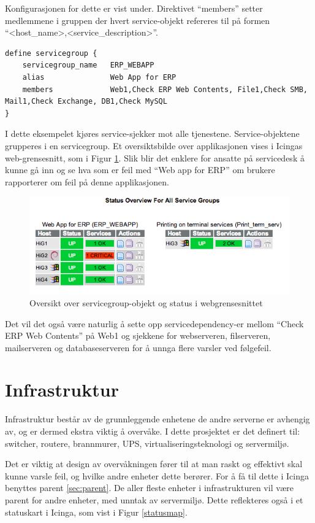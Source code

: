 Konfigurasjonen for dette er vist under. Direktivet ``members'' setter medlemmene i gruppen der hvert service-objekt refereres til på formen ``<host\_name>,<service\_description>''.

\begin{lstlisting}[style=example]
define servicegroup {
	servicegroup_name	ERP_WEBAPP
	alias 				Web App for ERP
	members 			Web1,Check ERP Web Contents, File1,Check SMB, Mail1,Check Exchange, DB1,Check MySQL
}
\end{lstlisting}

I dette eksempelet kjøres service-sjekker mot alle tjenestene. Service-objektene grupperes i en servicegroup. Et oversiktsbilde over applikasjonen vises i Icingas web-grensesnitt, som i Figur \ref{servicegroup_web}. Slik blir det enklere for ansatte på servicedesk å kunne gå inn og se hva som er feil med ``Web app for ERP'' om brukere rapporterer om feil på denne applikasjonen.

\begin{figure}[H]
    \centering
    \includegraphics[scale=0.6]{img/servicegroup_web}
    \caption{ Oversikt over servicegroup-objekt og status i webgrensesnittet}
    \label{servicegroup_web}
\end{figure}
Det vil det også være naturlig å sette opp servicedependency-er mellom ``Check ERP Web Contents'' på Web1 og sjekkene for webserveren, filserveren, mailserveren og databaseserveren for å unnga flere varsler ved følgefeil.

\section{Infrastruktur}
Infrastruktur består av de grunnleggende enhetene de andre serverne er avhengig av, og er dermed ekstra viktig å overvåke. I dette prosjektet er det definert til: switcher, routere, brannmurer, UPS, virtualiseringsteknologi og servermiljø.

Det er viktig at design av overvåkningen fører til at man raskt og effektivt skal kunne varsle feil, og hvilke andre enheter dette berører. For å få til dette i Icinga benyttes parent \ref{sec:parent}. De aller fleste enheter i infrastrukturen vil være parent for andre enheter, med unntak av servermiljø. Dette reflekteres også i et statuskart i Icinga, som vist i Figur \ref{statusmap}.


